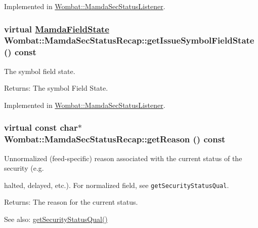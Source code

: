Implemented in \hyperlink{classWombat_1_1MamdaSecStatusListener_8d05183ac7dac8914259842d6f860a1b}{Wombat::Mamda\-Sec\-Status\-Listener}.\hypertarget{classWombat_1_1MamdaSecStatusRecap_d67e7143d6ebe662b87d76dbbe271dd3}{
\subsubsection[getIssueSymbolFieldState]{\setlength{\rightskip}{0pt plus 5cm}virtual \hyperlink{namespaceWombat_93aac974f2ab713554fd12a1fa3b7d2a}{Mamda\-Field\-State} Wombat::Mamda\-Sec\-Status\-Recap::get\-Issue\-Symbol\-Field\-State () const}}
\label{classWombat_1_1MamdaSecStatusRecap_d67e7143d6ebe662b87d76dbbe271dd3}


The symbol field state. 

\begin{Desc}
\item[Returns:]The symbol Field State. \end{Desc}


Implemented in \hyperlink{classWombat_1_1MamdaSecStatusListener_bfbb5289809053bd0864dbbec9f40edf}{Wombat::Mamda\-Sec\-Status\-Listener}.\hypertarget{classWombat_1_1MamdaSecStatusRecap_f83eee9cbddcaef097d1c2543ea6bf28}{
\subsubsection[getReason]{\setlength{\rightskip}{0pt plus 5cm}virtual const char$\ast$ Wombat::Mamda\-Sec\-Status\-Recap::get\-Reason () const}}
\label{classWombat_1_1MamdaSecStatusRecap_f83eee9cbddcaef097d1c2543ea6bf28}


Unnormalized (feed-specific) reason associated with the current status of the security (e.g. 

halted, delayed, etc.). For normalized field, see {\tt get\-Security\-Status\-Qual}.

\begin{Desc}
\item[Returns:]The reason for the current status. \end{Desc}
\begin{Desc}
\item[See also:]\hyperlink{classWombat_1_1MamdaSecStatusRecap_a33dfbf74883ec2304a39edc9e87b477}{get\-Security\-Status\-Qual()} \end{Desc}


